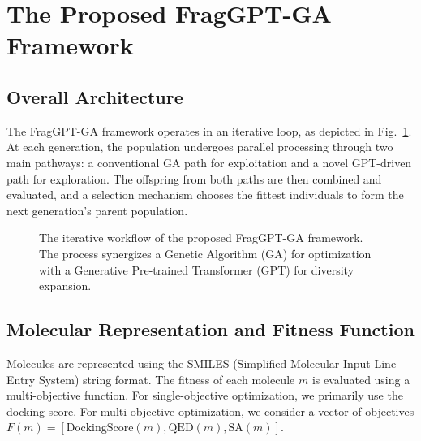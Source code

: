 \documentclass[lettersize,journal]{IEEEtran}
\begin{document}
\section{The Proposed FragGPT-GA Framework}
\subsection{Overall Architecture}
The FragGPT-GA framework operates in an iterative loop, as depicted in Fig.~\ref{fig:flowchart}. At each generation, the population undergoes parallel processing through two main pathways: a conventional GA path for exploitation and a novel GPT-driven path for exploration. The offspring from both paths are then combined and evaluated, and a selection mechanism chooses the fittest individuals to form the next generation's parent population.

\begin{figure}[!t]
\centering
\caption{The iterative workflow of the proposed FragGPT-GA framework. The process synergizes a Genetic Algorithm (GA) for optimization with a Generative Pre-trained Transformer (GPT) for diversity expansion.}
\label{fig:flowchart}
\end{figure}

\subsection{Molecular Representation and Fitness Function}
Molecules are represented using the SMILES (Simplified Molecular-Input Line-Entry System) string format. The fitness of each molecule $m$ is evaluated using a multi-objective function. For single-objective optimization, we primarily use the docking score. For multi-objective optimization, we consider a vector of objectives $F(m) = [\text{DockingScore}(m), \text{QED}(m), \text{SA}(m)]$.
\end{document}
